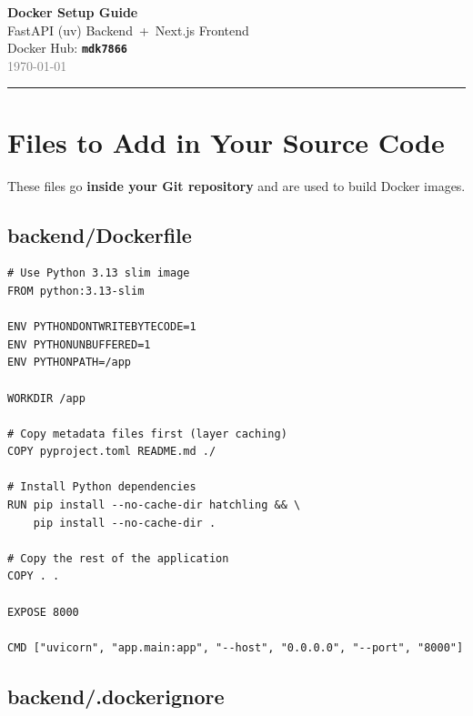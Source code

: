 \documentclass[12pt]{article}
\newenvironment{codeblock}{%
  \needspace{6\baselineskip}%
  \noindent\minipage{\linewidth}%
}{%
  \endminipage%
}
\begin{document}
\begin{center}
  {\Huge\bfseries\color{sectioncolor} Docker Setup Guide}\\[6pt]
  {\large\color{gray} FastAPI (uv) Backend\ +\ Next.js Frontend}\\[4pt]
  {\normalsize Docker Hub: \texttt{\textbf{mdk7866}}}\\[2pt]
  \textcolor{gray}{\small \today}
\end{center}
\vspace{4pt}\hrule\vspace{10pt}

\section{Files to Add in Your Source Code}

These files go \textbf{inside your Git repository} and are used to build Docker images.

\subsection{backend/Dockerfile}

\begin{codeblock}
\begin{lstlisting}[style=codestyle]
# Use Python 3.13 slim image
FROM python:3.13-slim

ENV PYTHONDONTWRITEBYTECODE=1
ENV PYTHONUNBUFFERED=1
ENV PYTHONPATH=/app

WORKDIR /app

# Copy metadata files first (layer caching)
COPY pyproject.toml README.md ./

# Install Python dependencies
RUN pip install --no-cache-dir hatchling && \
    pip install --no-cache-dir .

# Copy the rest of the application
COPY . .

EXPOSE 8000

CMD ["uvicorn", "app.main:app", "--host", "0.0.0.0", "--port", "8000"]
\end{lstlisting}
\end{codeblock}

\subsection{backend/.dockerignore}
\end{document}
